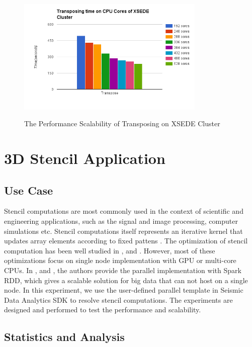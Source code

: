 \begin{figure}[h]
\centering
\includegraphics[width=0.8\textwidth]{figures/XSEDETest.png}\\
\caption{The Performance Scalability of Transposing on XSEDE Cluster }\label{XSEDETest}
\end{figure}


\section{3D Stencil Application}

\subsection{Use Case}

Stencil computations are most commonly used in the context of scientific and engineering applications, such as the signal and image processing, computer simulations etc.
Stencil computations itself represents an iterative kernel that updates array elements according to fixed pattens \cite{StencilWiki}. The optimization of stencil computation has been well studied in \cite{Han2011PADS},\cite{Nguyen2010Blocking} and \cite{Datta2008Stencil}. 
However, most of these optimizations focus on single node implementation with GPU or multi-core CPUs. In \cite{YanMasterThesis}, \cite{7363985} and \cite{7396203}, the authors provide the parallel implementation with Spark RDD, which gives a scalable solution for big data that can not host on a single node. 
In this experiment, we use the user-defined parallel template in Seismic Data Analytics SDK to resolve stencil computations. The experiments are designed and performed to test the performance and scalability.

\subsection{Statistics and Analysis}

